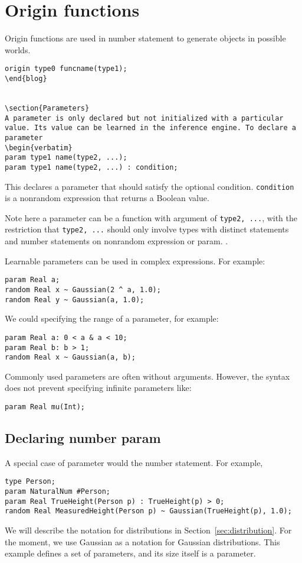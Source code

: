 \documentclass[12pt]{article}
\begin{document}
\section{Origin functions}
Origin functions are used in number statement to generate objects in possible worlds. 
\begin{verbatim}
origin type0 funcname(type1);
\end{blog}


\section{Parameters}
A parameter is only declared but not initialized with a particular value. Its value can be learned in the inference engine. To declare a parameter
\begin{verbatim}
param type1 name(type2, ...);
param type1 name(type2, ...) : condition;
\end{verbatim} 
This declares a parameter that should satisfy the optional condition. \texttt{condition} is a nonrandom expression that returns a Boolean value. 

Note here a parameter can be a function with argument of \texttt{type2, ...}, with the restriction that \texttt{type2, ...} should only involve types with distinct statements and number statements on nonrandom expression or param.
. 

Learnable parameters can be used in complex expressions. For example:
\begin{verbatim}
param Real a;
random Real x ~ Gaussian(2 ^ a, 1.0);
random Real y ~ Gaussian(a, 1.0);
\end{verbatim}

We could specifying the range of a parameter, for example:
\begin{verbatim}
param Real a: 0 < a & a < 10;
param Real b: b > 1;
random Real x ~ Gaussian(a, b);
\end{verbatim}

Commonly used parameters are often without arguments. However, the syntax does not prevent specifying infinite parameters like:
\begin{verbatim}
param Real mu(Int);
\end{verbatim}

\subsection{Declaring number param}
A special case of parameter would the number statement. For example,
\begin{verbatim}
type Person;
param NaturalNum #Person;
param Real TrueHeight(Person p) : TrueHeight(p) > 0;
random Real MeasuredHeight(Person p) ~ Gaussian(TrueHeight(p), 1.0);
\end{verbatim}
We will describe the notation for distributions in Section~\ref{sec:distribution}. For the moment, we use Gaussian as a notation for Gaussian distributions.
This example defines a set of parameters, and its size itself is a parameter.
\end{document}
